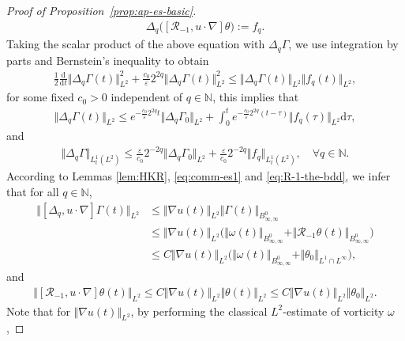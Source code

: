 \documentclass[reqno,11pt,a4paper]{amsart}
\newcommand{\dd}{\mathrm{d}}
\begin{document}
\begin{proof}[Proof of Proposition~\ref{prop:ap-es-basic}]
\begin{equation}
\begin{aligned}
  \Delta_q\big(\left[\mathcal{R}_{-1}, u \cdot \nabla\right] \theta\big)  := f_q .
\end{aligned}
\end{equation}
Taking the scalar product of the above equation with $\Delta_q \Gamma$, we use integration by parts and Bernstein's inequality to obtain
\begin{align*}
  \frac{1}{2}\frac{\dd}{\dd t} \Vert \Delta_q\Gamma(t)\Vert _{L^2}^2 
  + \frac{c_0}{\varepsilon} 2^{2 q} \Vert  \Delta_q \Gamma(t)\Vert _{L^2}^2
  \leq \Vert \Delta_q \Gamma(t)\Vert _{L^2} \Vert f_q(t)\Vert _{L^2},
\end{align*}
for some fixed $c_0>0$ independent of $q\in\mathbb{N}$, this implies that
\begin{align*}
  \Vert \Delta_q \Gamma(t)\Vert _{L^2} \leq e^{-\frac{c_0}{\varepsilon}2^{2q}t} \Vert \Delta_q \Gamma_0\Vert _{L^2}
  + \int_0^t e^{-\frac{c_0}{\varepsilon}2^{2q}(t-\tau)} \Vert f_q(\tau)\Vert _{L^2} \dd \tau,  
\end{align*}
and
\begin{align}\label{eq:Gamma-est1}
  \Vert \Delta_q\Gamma\Vert _{L^1_t(L^2)} \leq \frac{\varepsilon}{c_0} 2^{-2 q} \Vert \Delta_q \Gamma_0\Vert _{L^2}
  + \frac{\varepsilon}{c_0} 2^{-2 q} \Vert f_q\Vert _{L^1_t(L^2)},
  \quad \forall q\in\mathbb{N}.
\end{align}
According to Lemmas \ref{lem:HKR}, \eqref{eq:comm-es1} and \eqref{eq:R-1-the-bdd},
we infer that for all $q\in \mathbb{N}$,
\begin{align}
  \Vert [\Delta_q, u\cdot\nabla]\Gamma(t)\Vert _{L^2} & \leq \Vert \nabla u(t)\Vert _{L^2} \Vert \Gamma(t)\Vert _{B^0_{\infty,\infty}}\nonumber\\
  & \leq \Vert \nabla u(t)\Vert _{L^2} \big(\Vert \omega(t)\Vert _{B^0_{\infty,\infty}} 
  + \Vert \mathcal{R}_{-1}\theta(t)\Vert _{B^0_{\infty,\infty}}\big)\label{es:fq1}\\
  & \leq C \Vert \nabla u(t)\Vert _{L^2} \big(\Vert \omega(t)\Vert _{B^0_{\infty,\infty}} + \Vert \theta_0\Vert _{L^1\cap L^\infty}\big),\nonumber
\end{align}
and
\begin{align}\label{es:fq2}
  \Vert [\mathcal{R}_{-1},u\cdot\nabla]\theta(t)\Vert _{L^2} \leq C \Vert \nabla u(t)\Vert _{L^2} \Vert \theta(t)\Vert _{L^2}
   \leq C \Vert \nabla u(t)\Vert _{L^2} \Vert \theta_0\Vert _{L^2}.
\end{align}
Note that for $\Vert \nabla u(t)\Vert _{L^2}$, by performing the classical $L^2$-estimate of vorticity $\omega$, 

\end{proof}
\end{document}
